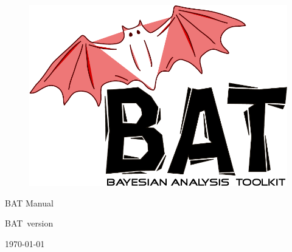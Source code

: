 \documentclass[
12pt,
a4paper,
bibliography=totoc,
captions=nooneline, %
numbers=noenddot,
twoside]{scrbook}
\newcommand{\bat}{{\sc BAT}}
\newcommand{\version}{version~\versionno}
\begin{document}

\thispagestyle{empty}

\begin{figure}
\includegraphics[scale=0.25]{bat}
\end{figure}

\vspace*{1cm}

\begin{center}


{\Large \bat{} Manual}
\\

\vspace{1cm}

{\large \bat\ \version}

\end{center}

\thispagestyle{empty}

\vfill

\begin{center}
\today
\end{center}

\pagebreak


\thispagestyle{empty}

\enlargethispage{2cm}

\tableofcontents{}


\mainmatter
\end{document}
